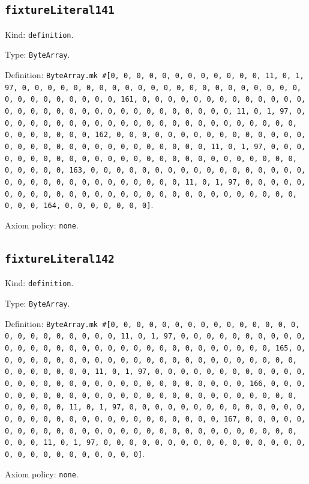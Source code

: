 \documentclass[11pt]{article}
\begin{document}
\subsection*{\texttt{fixtureLiteral141}}
\noindent Kind: \texttt{definition}.\par
\noindent Type: \texttt{ByteArray}.\par
\noindent Definition: \texttt{ByteArray.mk \#[0, 0, 0, 0, 0, 0, 0, 0, 0, 0, 0, 0, 11, 0, 1, 97, 0, 0, 0, 0, 0, 0, 0, 0, 0, 0, 0, 0, 0, 0, 0, 0, 0, 0, 0, 0, 0, 0, 0, 0, 0, 0, 0, 0, 0, 0, 0, 161, 0, 0, 0, 0, 0, 0, 0, 0, 0, 0, 0, 0, 0, 0, 0, 0, 0, 0, 0, 0, 0, 0, 0, 0, 0, 0, 0, 0, 0, 0, 0, 11, 0, 1, 97, 0, 0, 0, 0, 0, 0, 0, 0, 0, 0, 0, 0, 0, 0, 0, 0, 0, 0, 0, 0, 0, 0, 0, 0, 0, 0, 0, 0, 0, 0, 0, 162, 0, 0, 0, 0, 0, 0, 0, 0, 0, 0, 0, 0, 0, 0, 0, 0, 0, 0, 0, 0, 0, 0, 0, 0, 0, 0, 0, 0, 0, 0, 0, 11, 0, 1, 97, 0, 0, 0, 0, 0, 0, 0, 0, 0, 0, 0, 0, 0, 0, 0, 0, 0, 0, 0, 0, 0, 0, 0, 0, 0, 0, 0, 0, 0, 0, 0, 163, 0, 0, 0, 0, 0, 0, 0, 0, 0, 0, 0, 0, 0, 0, 0, 0, 0, 0, 0, 0, 0, 0, 0, 0, 0, 0, 0, 0, 0, 0, 0, 11, 0, 1, 97, 0, 0, 0, 0, 0, 0, 0, 0, 0, 0, 0, 0, 0, 0, 0, 0, 0, 0, 0, 0, 0, 0, 0, 0, 0, 0, 0, 0, 0, 0, 0, 164, 0, 0, 0, 0, 0, 0, 0]}.\par
\noindent Axiom policy: \texttt{none}.\par
\subsection*{\texttt{fixtureLiteral142}}
\noindent Kind: \texttt{definition}.\par
\noindent Type: \texttt{ByteArray}.\par
\noindent Definition: \texttt{ByteArray.mk \#[0, 0, 0, 0, 0, 0, 0, 0, 0, 0, 0, 0, 0, 0, 0, 0, 0, 0, 0, 0, 0, 0, 0, 0, 11, 0, 1, 97, 0, 0, 0, 0, 0, 0, 0, 0, 0, 0, 0, 0, 0, 0, 0, 0, 0, 0, 0, 0, 0, 0, 0, 0, 0, 0, 0, 0, 0, 0, 0, 165, 0, 0, 0, 0, 0, 0, 0, 0, 0, 0, 0, 0, 0, 0, 0, 0, 0, 0, 0, 0, 0, 0, 0, 0, 0, 0, 0, 0, 0, 0, 0, 11, 0, 1, 97, 0, 0, 0, 0, 0, 0, 0, 0, 0, 0, 0, 0, 0, 0, 0, 0, 0, 0, 0, 0, 0, 0, 0, 0, 0, 0, 0, 0, 0, 0, 0, 166, 0, 0, 0, 0, 0, 0, 0, 0, 0, 0, 0, 0, 0, 0, 0, 0, 0, 0, 0, 0, 0, 0, 0, 0, 0, 0, 0, 0, 0, 0, 0, 11, 0, 1, 97, 0, 0, 0, 0, 0, 0, 0, 0, 0, 0, 0, 0, 0, 0, 0, 0, 0, 0, 0, 0, 0, 0, 0, 0, 0, 0, 0, 0, 0, 0, 0, 167, 0, 0, 0, 0, 0, 0, 0, 0, 0, 0, 0, 0, 0, 0, 0, 0, 0, 0, 0, 0, 0, 0, 0, 0, 0, 0, 0, 0, 0, 0, 0, 11, 0, 1, 97, 0, 0, 0, 0, 0, 0, 0, 0, 0, 0, 0, 0, 0, 0, 0, 0, 0, 0, 0, 0, 0, 0, 0, 0, 0, 0, 0]}.\par
\noindent Axiom policy: \texttt{none}.\par
\end{document}
